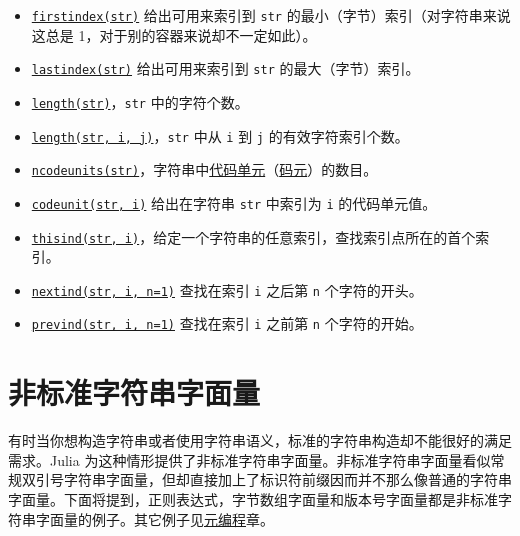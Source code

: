 \begin{itemize}
\item \hyperlink{16943669671291374223}{\texttt{firstindex(str)}} 给出可用来索引到 \texttt{str} 的最小（字节）索引（对字符串来说这总是 1，对于别的容器来说却不一定如此）。


\item \hyperlink{15780929618270241785}{\texttt{lastindex(str)}} 给出可用来索引到 \texttt{str} 的最大（字节）索引。


\item \hyperlink{3699181304419743826}{\texttt{length(str)}}，\texttt{str} 中的字符个数。


\item \hyperlink{3699181304419743826}{\texttt{length(str, i, j)}}，\texttt{str} 中从 \texttt{i} 到 \texttt{j} 的有效字符索引个数。


\item \hyperlink{1775518749150675445}{\texttt{ncodeunits(str)}}，字符串中\href{https://en.wikipedia.org/wiki/Character\_encoding\#Terminology}{代码单元}（\href{https://zh.wikipedia.org/wiki/字符编码\#字符集、代码页，与字符映射}{码元}）的数目。


\item \hyperlink{16983098119361955361}{\texttt{codeunit(str, i)}} 给出在字符串 \texttt{str} 中索引为 \texttt{i} 的代码单元值。


\item \hyperlink{11299403048911786045}{\texttt{thisind(str, i)}}，给定一个字符串的任意索引，查找索引点所在的首个索引。


\item \hyperlink{7455293228649070526}{\texttt{nextind(str, i, n=1)}} 查找在索引 \texttt{i} 之后第 \texttt{n} 个字符的开头。


\item \hyperlink{15871508897466976220}{\texttt{prevind(str, i, n=1)}} 查找在索引 \texttt{i} 之前第 \texttt{n} 个字符的开始。

\end{itemize}


\hypertarget{7550171062631975520}{}


\section{非标准字符串字面量}



有时当你想构造字符串或者使用字符串语义，标准的字符串构造却不能很好的满足需求。Julia 为这种情形提供了非标准字符串字面量。非标准字符串字面量看似常规双引号字符串字面量，但却直接加上了标识符前缀因而并不那么像普通的字符串字面量。下面将提到，正则表达式，字节数组字面量和版本号字面量都是非标准字符串字面量的例子。其它例子见\hyperlink{12781685063176814936}{元编程}章。



